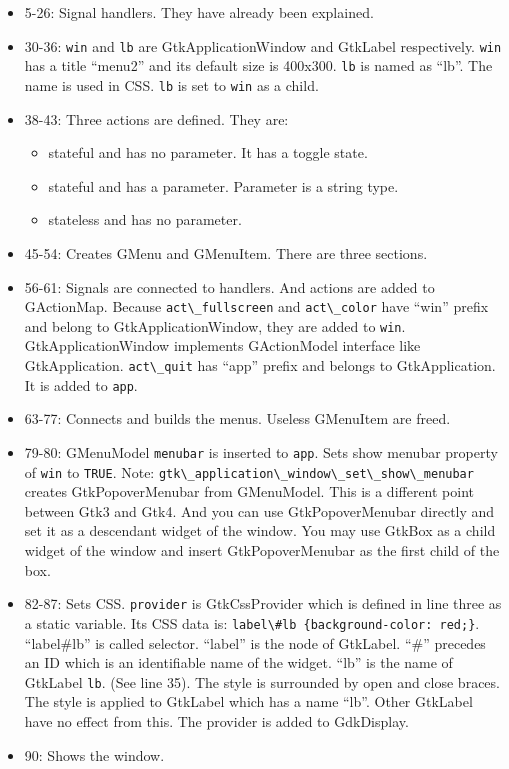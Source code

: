 \begin{itemize}
\tightlist
\item
  5-26: Signal handlers. They have already been explained.
\item
  30-36: \passthrough{\lstinline!win!} and \passthrough{\lstinline!lb!}
  are GtkApplicationWindow and GtkLabel respectively.
  \passthrough{\lstinline!win!} has a title ``menu2'' and its default
  size is 400x300. \passthrough{\lstinline!lb!} is named as ``lb''. The
  name is used in CSS. \passthrough{\lstinline!lb!} is set to
  \passthrough{\lstinline!win!} as a child.
\item
  38-43: Three actions are defined. They are:

  \begin{itemize}
  \tightlist
  \item
    stateful and has no parameter. It has a toggle state.
  \item
    stateful and has a parameter. Parameter is a string type.
  \item
    stateless and has no parameter.
  \end{itemize}
\item
  45-54: Creates GMenu and GMenuItem. There are three sections.
\item
  56-61: Signals are connected to handlers. And actions are added to
  GActionMap. Because \passthrough{\lstinline!act\_fullscreen!} and
  \passthrough{\lstinline!act\_color!} have ``win'' prefix and belong to
  GtkApplicationWindow, they are added to \passthrough{\lstinline!win!}.
  GtkApplicationWindow implements GActionModel interface like
  GtkApplication. \passthrough{\lstinline!act\_quit!} has ``app'' prefix
  and belongs to GtkApplication. It is added to
  \passthrough{\lstinline!app!}.
\item
  63-77: Connects and builds the menus. Useless GMenuItem are freed.
\item
  79-80: GMenuModel \passthrough{\lstinline!menubar!} is inserted to
  \passthrough{\lstinline!app!}. Sets show menubar property of
  \passthrough{\lstinline!win!} to \passthrough{\lstinline!TRUE!}. Note:
  \passthrough{\lstinline!gtk\_application\_window\_set\_show\_menubar!}
  creates GtkPopoverMenubar from GMenuModel. This is a different point
  between Gtk3 and Gtk4. And you can use GtkPopoverMenubar directly and
  set it as a descendant widget of the window. You may use GtkBox as a
  child widget of the window and insert GtkPopoverMenubar as the first
  child of the box.
\item
  82-87: Sets CSS. \passthrough{\lstinline!provider!} is GtkCssProvider
  which is defined in line three as a static variable. Its CSS data is:
  \passthrough{\lstinline!label\#lb \{background-color: red;\}!}.
  ``label\#lb'' is called selector. ``label'' is the node of GtkLabel.
  ``\#'' precedes an ID which is an identifiable name of the widget.
  ``lb'' is the name of GtkLabel \passthrough{\lstinline!lb!}. (See line
  35). The style is surrounded by open and close braces. The style is
  applied to GtkLabel which has a name ``lb''. Other GtkLabel have no
  effect from this. The provider is added to GdkDisplay.
\item
  90: Shows the window.
\end{itemize}
